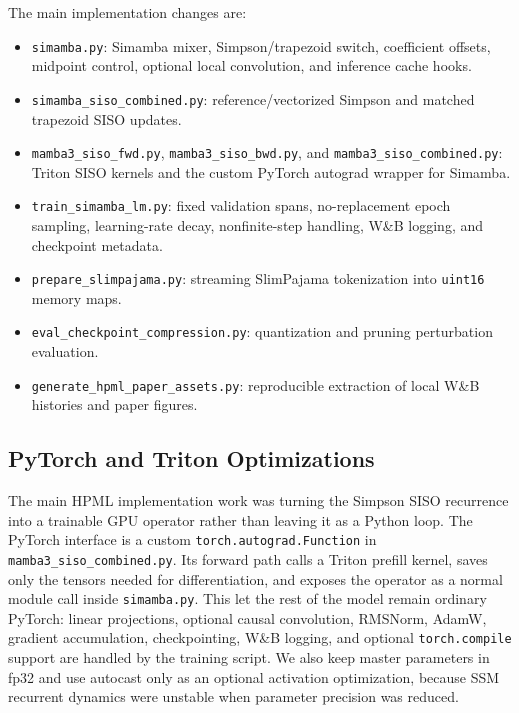 \documentclass[conference]{IEEEtran}
\newcommand{\modelname}{Simamba\xspace}
\begin{document}
The main implementation changes are:
\begin{itemize}
    \item \texttt{simamba.py}: \modelname mixer, Simpson/trapezoid switch, coefficient offsets, midpoint control, optional local convolution, and inference cache hooks.
    \item \texttt{simamba\_siso\_combined.py}: reference/vectorized Simpson and matched trapezoid SISO updates.
    \item \texttt{mamba3\_siso\_fwd.py}, \texttt{mamba3\_siso\_bwd.py}, and \texttt{mamba3\_siso\_combined.py}: Triton SISO kernels and the custom PyTorch autograd wrapper for \modelname.
    \item \texttt{train\_simamba\_lm.py}: fixed validation spans, no-replacement epoch sampling, learning-rate decay, nonfinite-step handling, W\&B logging, and checkpoint metadata.
    \item \texttt{prepare\_slimpajama.py}: streaming SlimPajama tokenization into \texttt{uint16} memory maps.
    \item \texttt{eval\_checkpoint\_compression.py}: quantization and pruning perturbation evaluation.
    \item \texttt{generate\_hpml\_paper\_assets.py}: reproducible extraction of local W\&B histories and paper figures.
\end{itemize}

\subsection{PyTorch and Triton Optimizations}

The main HPML implementation work was turning the Simpson SISO recurrence into a trainable GPU operator rather than leaving it as a Python loop. The PyTorch interface is a custom \texttt{torch.autograd.Function} in \texttt{mamba3\_siso\_combined.py}. Its forward path calls a Triton prefill kernel, saves only the tensors needed for differentiation, and exposes the operator as a normal module call inside \texttt{simamba.py}. This let the rest of the model remain ordinary PyTorch: linear projections, optional causal convolution, RMSNorm, AdamW, gradient accumulation, checkpointing, W\&B logging, and optional \texttt{torch.compile} support are handled by the training script. We also keep master parameters in fp32 and use autocast only as an optional activation optimization, because SSM recurrent dynamics were unstable when parameter precision was reduced.
\end{document}
